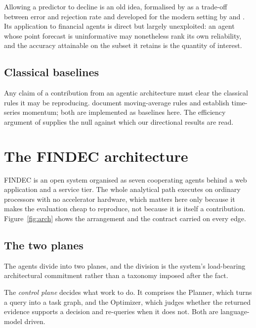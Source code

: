 \documentclass[pdflatex,sn-apa]{sn-jnl}%
\theoremstyle{thmstyleone}%
\theoremstyle{thmstyletwo}%
\theoremstyle{thmstylethree}%
\begin{document}
Allowing a predictor to decline is an old idea, formalised by
\citet{chow1970optimum} as a trade-off between error and rejection rate and
developed for the modern setting by \citet{elyaniv2010foundations} and
\citet{geifman2017selective}. Its application to financial agents is direct but
largely unexploited: an agent whose point forecast is uninformative may
nonetheless rank its own reliability, and the accuracy attainable on the subset
it retains is the quantity of interest.

\subsection{Classical baselines}\label{subsec:related-baselines}

Any claim of a contribution from an agentic architecture must clear the
classical rules it may be reproducing. \citet{brock1992simple} document
moving-average rules and \citet{moskowitz2012timeseries} establish time-series
momentum; both are implemented as baselines here. The efficiency argument of
\citet{fama1970efficient} supplies the null against which our directional
results are read.

\section{The FINDEC architecture}\label{sec:arch}

FINDEC is an open system organised as seven cooperating agents behind a web
application and a service tier. The whole analytical path executes on ordinary
processors with no accelerator hardware, which matters here only because it
makes the evaluation cheap to reproduce, not because it is itself a
contribution. Figure~\ref{fig:arch} shows the arrangement and the contract
carried on every edge.

\subsection{The two planes}\label{subsec:planes}

The agents divide into two planes, and the division is the system's load-bearing
architectural commitment rather than a taxonomy imposed after the fact.

The \emph{control plane} decides what work to do. It comprises the Planner,
which turns a query into a task graph, and the Optimizer, which judges whether
the returned evidence supports a decision and re-queries when it does not. Both
are language-model driven.
\end{document}
